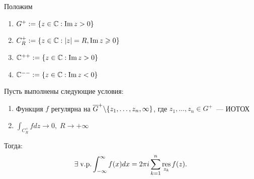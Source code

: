 Положим
\begin{enumerate}
    \item $G^+ := \{z \in \mathbb{C}: \operatorname{Im} z > 0\}$
    \item $C_R^+ := \{z \in \mathbb{C}: |z| = R, \operatorname{Im} z \geqslant 0\}$
    \item $\mathbb{C}^{++} := \{z \in \mathbb{C}: \operatorname{Im} z > 0\}$
    \item $\mathbb{C}^{--} := \{z \in \mathbb{C}: \operatorname{Im} z < 0\}$
\end{enumerate}

\begin{lemma}[<<$+$>>]
	Пусть выполнены следующие условия:
	\begin{enumerate}
		\item Функция $f$ регулярна на $\overline{G}^+ \backslash \{z_1, \dotsc, z_n, \infty\}$, где $z_1, \dotsc, z_n \in G^+$~--- ИОТОХ
		\item $\int_{C_R^+}fdz \to 0,\; R \to +\infty$
	\end{enumerate}
	
	Тогда:
	\[\exists\; \text{v.p.} \int_{-\infty}^{\infty} f(x) dx = 2\pi i \sum_{k = 1}^n \operatorname*{res}_{z_k}f(z).\]
\end{lemma}

